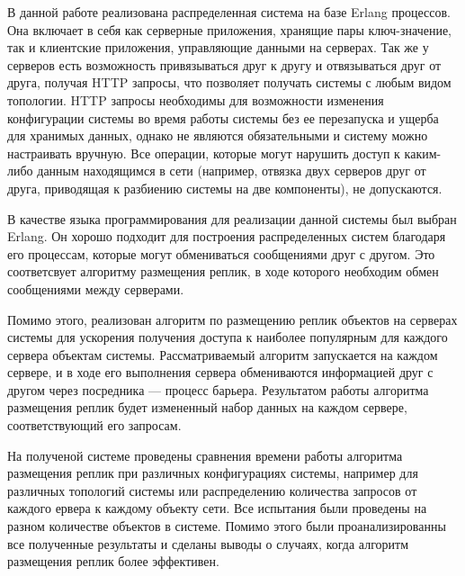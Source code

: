 





\newpage

\tableofcontents
\newpage

\Intro
	В данной работе реализована распределенная система на базе Erlang процессов. Она включает в себя как серверные приложения, хранящие пары ключ-значение, так и клиентские приложения,
	управляющие данными на серверах. Так же у серверов есть возможность привязываться друг к другу и отвязываться друг от друга, получая HTTP запросы, что позволяет получать системы с 
	любым видом топологии. HTTP запросы необходимы для возможности изменения конфигурации системы во время работы системы без ее перезапуска и ущерба для хранимых данных, однако не являются 
	обязательными и систему можно настраивать вручную. Все операции, которые могут нарушить доступ к каким-либо данным находящимся в сети (например, отвязка двух серверов друг от друга, 
	приводящая к разбиению системы на две компоненты), не допускаются.

	В качестве языка программирования для реализации данной системы был выбран Erlang. Он хорошо подходит для построения распределенных систем благодаря его процессам, которые могут обмениваться 
	сообщениями друг с другом. Это соответсвует алгоритму размещения реплик, в ходе которого необходим обмен сообщениями между серверами.
	
	Помимо этого, реализован алгоритм по размещению реплик объектов на серверах системы для ускорения получения доступа к наиболее популярным для каждого сервера объектам системы. Рассматриваемый 
	алгоритм запускается на каждом сервере, и в ходе его выполнения сервера обмениваются информацией друг с другом через посредника --- процесс барьера. Результатом работы алгоритма размещения 
	реплик будет измененный набор данных на каждом сервере, соответствующий его запросам.
	
	На полученой системе проведены сравнения времени работы алгоритма размещения реплик при различных конфигурациях системы, например для различных топологий системы или распределению количества
	запросов от каждого ервера к каждому объекту сети. Все испытания были проведены на разном количестве объектов в системе. Помимо этого были проанализированны все полученные результаты 
	и сделаны выводы о случаях, когда алгоритм размещения реплик более эффективен.
	
